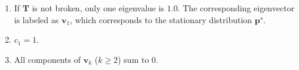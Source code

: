 \documentclass{report}
\begin{document}
\begin{itemize}
\begin{enumerate}
    \item
    If $\mathbf T$ is not broken, only one eigenvalue is $1.0$.
    The corresponding eigenvector is labeled as $\mathbf v_1$,
    which corresponds to the stationary distribution $\mathbf p^s$.

    \item
    $c_1 = 1$.

    \item
    All components of $\mathbf v_k$ ($k \ge 2$)
    sum to $0$.
  \end{enumerate}
\end{itemize}



\end{document}
